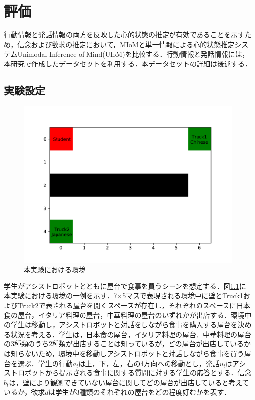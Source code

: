 \chapter{評価}
\par
行動情報と発話情報の両方を反映した心的状態の推定が有効であることを示すため，信念および欲求の推定において，MIoMと単一情報による心的状態推定システムUnimodal Inference of Mind(UIoM)を比較する．行動情報と発話情報には，本研究で作成したデータセットを利用する．本データセットの詳細は後述する．

\section{実験設定}

\begin{figure}[htbp]
  \begin{center}
    \includegraphics[]{./figure.pdf}
    \caption{本実験における環境}
    \label{fig:ex_env}
  \end{center}
\end{figure}

\par
学生がアシストロボットとともに屋台で食事を買うシーンを想定する．図\ref{fig:ex_env}に本実験における環境の一例を示す．7$\times$5マスで表現される環境中に壁とTruck1およびTruck2で表される屋台を開くスペースが存在し，それぞれのスペースに日本食の屋台，イタリア料理の屋台，中華料理の屋台のいずれかが出店する．環境中の学生は移動し，アシストロボットと対話をしながら食事を購入する屋台を決める状況を考える．学生は，日本食の屋台，イタリア料理の屋台，中華料理の屋台の3種類のうち2種類が出店することは知っているが，どの屋台が出店しているかは知らないため，環境中を移動しアシストロボットと対話しながら食事を買う屋台を選ぶ．学生の行動$a_t$は上，下，左，右の4方向への移動とし，発話$u_t$はアシストロボットから提示される食事に関する質問に対する学生の応答とする．信念$b_t$は，壁により観測できていない屋台に関してどの屋台が出店していると考えているか，欲求$d$は学生が3種類のそれぞれの屋台をどの程度好むかを表す．



